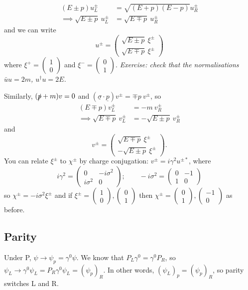 \documentclass[a4paper,12pt]{article}
\newcommand{\icol}[1]{%
  \left(\begin{smallmatrix}#1\end{smallmatrix}\right)%
}
\begin{document}
\begin{equation}
\begin{split}
(E \pm p)u_L^\pm &= \sqrt{(E+p)(E-p)}u_R^\pm \\
\implies \sqrt{E\pm p}\ u_L^\pm &= \sqrt{E \mp p}\ u_R^\pm 
\end{split}
\end{equation}
and we can write
%
\[ u^\pm =
\left( \begin{array}{c}
\sqrt{E \pm p} \ \xi^\pm   \\
\sqrt{E \mp p} \ \xi^\pm  \end{array} \right) \] 
%
where $\xi^+ = \icol{1\\0}$ and $\xi^- = \icol{0\\1}$. 
\newline
\newline
\textit{Exercise: check that the normalisations $\bar{u}u = 2m$, $u^\dagger u = 2E$.}
\newline

Similarly, $(\slashed{p} +m)v = 0$ and $(\underline{\sigma}\cdot\underline{p})v^\pm = \mp p\ v^\pm$, so 
\begin{equation}
\begin{split}
(E \mp p)v_L^\pm &= -m\ v_R^\pm \\
\implies \sqrt{E\mp p}\ v_L^\pm &= -\sqrt{E \pm p}\ v_R^\pm 
\end{split}
\end{equation}
and
%
\[ v^\pm =
\left( \begin{array}{c}
\sqrt{E \mp p} \ \xi^\pm   \\
-\sqrt{E \pm p} \ \xi^\pm  \end{array} \right). \] 
%
You can relate $\xi^\pm$ to $\chi^\pm$ by charge conjugation: $v^\pm = i \gamma^2 u^{\pm *}$, where
%
\[ i\gamma^2 = \left( \begin{array}{cc}
0 & -i \sigma^2  \\
i\sigma^2 & 0  \end{array} \right); \qquad 
-i\sigma^2 = \left( \begin{array}{cc}
0 & -1 \\
1 & 0 \end{array} \right) \]
%
so $\chi^\pm = -i\sigma^2\xi^\pm$ and if $\xi^\pm = \icol{1\\0}, \icol{0\\1}$ then $\chi^\pm = \icol{0\\1}, \icol{-1\\0}$ as before.
%
\subsection{Parity}
%
Under P, $\psi \to \psi_p = \gamma^0\psi$. We know that $P_L \gamma^0 = \gamma^0 P_R$, so $\psi_L \to \gamma^0 \psi_L =  P_R\gamma^0 \psi_L = (\psi_p)_R$. In other words, $(\psi_L)_p = (\psi_p)_R$, so parity switches L and R.
\end{document}
